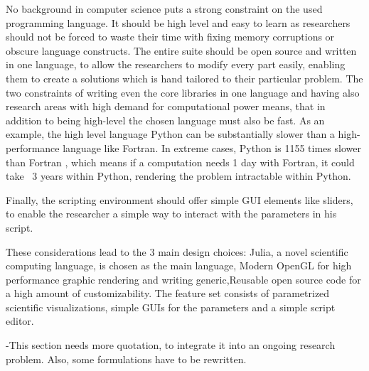 No background in computer science puts a strong constraint on the used programming language. It should be high level and easy to learn as researchers should not be forced to waste their time with fixing memory corruptions or obscure language constructs.
The entire suite should be open source and written in one language, to allow the researchers to modify every part easily, enabling them to create a solutions which is hand tailored to their particular problem.
The two constraints of writing even the core libraries in one language and having also research areas with high demand for computational power means, that in addition to being high-level the chosen language must also be fast.
As an example, the high level language Python can be substantially slower than a high-performance language like Fortran.
In extreme cases, Python is 1155 times slower than Fortran \cite{benchmark_python}, which means if a computation needs 1 day with Fortran, it could take ~3 years within Python, rendering the problem intractable within Python.

Finally, the scripting environment should offer simple GUI elements like sliders, to enable the researcher a simple way to interact with the parameters in his script.

These considerations lead to the 3 main design choices:
Julia, a novel scientific computing language, is chosen as the main language, Modern OpenGL for high performance graphic rendering and writing generic,Reusable open source code for a high amount of customizability.
The feature set consists of parametrized scientific visualizations, simple GUIs for the parameters and a simple script editor.

-This section needs more quotation, to integrate it into an ongoing research problem. Also, some formulations have to be rewritten.
\pagebreak
